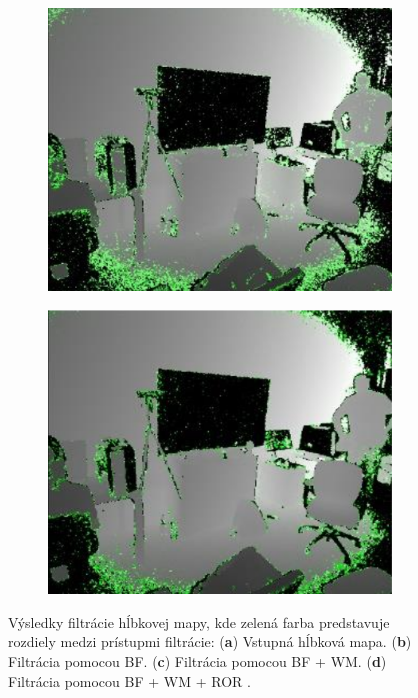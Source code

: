 \begin{figure}[H]
	\hfill
	\begin{subfigure}[b]{0.24\textwidth}
		\centering
		\includegraphics[width=\textwidth]{figures/resers_p.png}
		\caption{}
		\label{fig:resers:p}
	\end{subfigure}
	\hfill
	\begin{subfigure}[b]{0.24\textwidth}
		\centering
		\includegraphics[width=\textwidth]{figures/resers_q.png}
		\caption{}
		\label{fig:resers:q}
	\end{subfigure}
	\caption{Výsledky filtrácie hĺbkovej mapy, kde zelená farba predstavuje rozdiely medzi prístupmi filtrácie: (\textbf{a}) Vstupná hĺbková mapa. 
		(\textbf{b}) Filtrácia pomocou BF.
		(\textbf{c}) Filtrácia pomocou BF + WM.
		(\textbf{d}) Filtrácia pomocou BF + WM + ROR \cite{satnik2018multiview}. }
	\label{fig:resers:5}
\end{figure}


